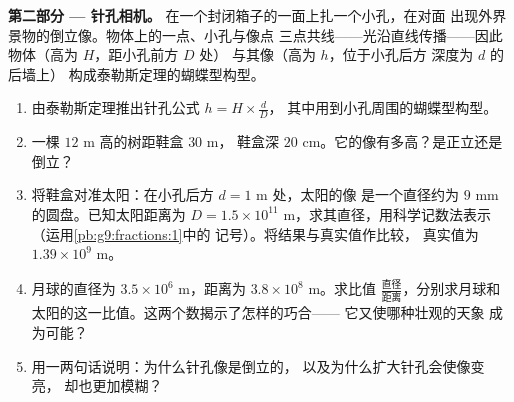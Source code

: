 \begin{problem}
\medskip
\noindent\textbf{第二部分 --- 针孔相机。}
在一个封闭箱子的一面上扎一个小孔，在对面
出现外界景物的倒立像。物体上的一点、小孔与像点
三点共线——光沿直线传播——因此
物体（高为 $H$，距小孔前方 $D$ 处）
与其像（高为 $h$，位于小孔后方
深度为 $d$ 的后墙上）
构成泰勒斯定理的蝴蝶型构型。
\begin{enumerate}[resume]
  \item 由泰勒斯定理推出针孔公式
        $h = H \times \frac dD$，
        其中用到小孔周围的蝴蝶型构型。
  \item 一棵 $12$ m 高的树距鞋盒 $30$ m，
        鞋盒深 $20$ cm。它的像有多高？是正立还是倒立？
  \item 将鞋盒对准太阳：在小孔后方 $d = 1$ m 处，太阳的像
        是一个直径约为
        $9$ mm 的圆盘。已知太阳距离为
        $D = 1.5 \times 10^{11}$ m，求其直径，用科学记数法表示
        （运用\cref{pb:g9:fractions:1}中的
        记号）。将结果与真实值作比较，
        真实值为 $1.39 \times 10^9$ m。
  \item 月球的直径为 $3.5 \times 10^6$ m，距离为
        $3.8 \times 10^8$ m。求比值
        $\frac{\text{直径}}{\text{距离}}$，分别求月球和
        太阳的这一比值。这两个数揭示了怎样的巧合——
        它又使哪种壮观的天象
        成为可能？
  \item 用一两句话说明：为什么针孔像是倒立的，
        以及为什么扩大针孔会使像变亮，
        却也更加模糊？
\end{enumerate}


\end{problem}

